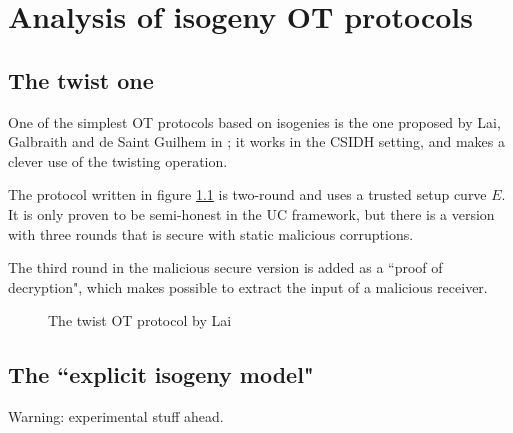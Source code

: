\chapter{Analysis of isogeny OT protocols}

\section{The twist one}
One of the simplest OT protocols based on isogenies is the one proposed by Lai, Galbraith and de Saint Guilhem in \cite{Lai_twists}; it works in the CSIDH setting, and makes a clever use of the twisting operation.

The protocol written in figure \ref{prot_twist} is two-round and uses a trusted setup curve $E$. It is only proven to be semi-honest in the UC framework, but there is a version with three rounds that is secure with static malicious corruptions.

The third round in the malicious secure version is added as a ``proof of decryption", which makes possible to extract the input of a malicious receiver.

\begin{figure}
    \caption{The twist OT protocol by Lai}
    \label{prot_twist}
\end{figure}


\section{The ``explicit isogeny model"}
Warning: experimental stuff ahead.

